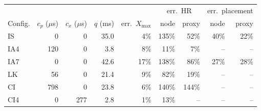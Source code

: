 \begin{tabular}{lrrrrrrrr}
\toprule
 & & & & & \multicolumn{2}{c}{err.\ HR} & \multicolumn{2}{c}{err.\ placement} \\
Config. & $c_p$ ($\mu$s) & $c_x$ ($\mu$s) & $q$ (ms) & err.\ $X_{\max}$ & node & proxy & node & proxy \\
\midrule
IS & 0 & 0 & 35.0 & 4\% & 135\% & 52\% & 40\% & 22\% \\
IA4 & 120 & 0 & 3.8 & 8\% & 11\% & 7\% & -- & -- \\
IA7 & 0 & 0 & 42.6 & 17\% & 138\% & 86\% & 27\% & 28\% \\
LK & 56 & 0 & 21.4 & 9\% & 82\% & 19\% & -- & -- \\
CI & 798 & 0 & 23.8 & 6\% & 140\% & 144\% & -- & -- \\
CI4 & 0 & 277 & 2.8 & 1\% & 13\% & -- & -- & -- \\
\bottomrule
\end{tabular}
